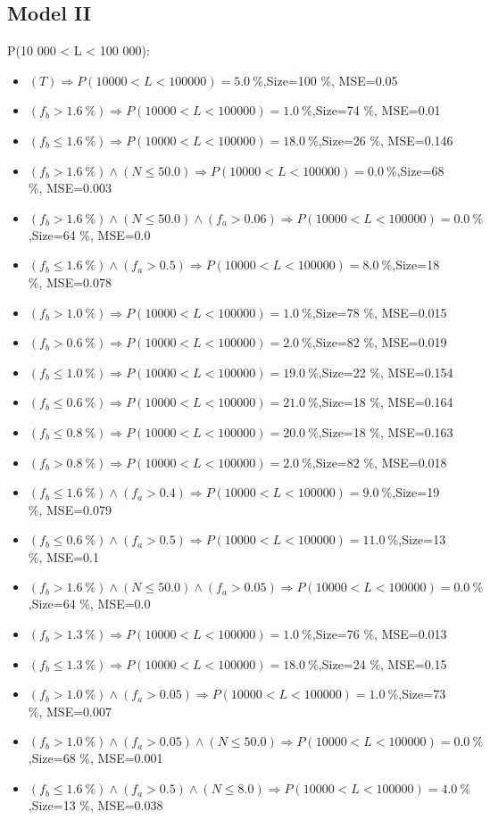 \documentclass[numbered]{CSL}
\begin{document}
\subsection{Model II}
P(10 000 < L < 100 000):
\begin{itemize}
\item $(T) \Rightarrow P(10 000 < L < 100 000) = 5.0~\%$,\hfill Size=100 \%, MSE=0.05
\item $(f_b > 1.6~\%) \Rightarrow P(10 000 < L < 100 000) = 1.0~\%$,\hfill Size=74 \%, MSE=0.01
\item $(f_b \leq 1.6~\%) \Rightarrow P(10 000 < L < 100 000) = 18.0~\%$,\hfill Size=26 \%, MSE=0.146
\item $(f_b > 1.6~\%) \land (N \leq 50.0) \Rightarrow P(10 000 < L < 100 000) = 0.0~\%$,\hfill Size=68 \%, MSE=0.003
\item $(f_b > 1.6~\%) \land (N \leq 50.0) \land (f_a > 0.06) \Rightarrow P(10 000 < L < 100 000) = 0.0~\%$,\hfill Size=64 \%, MSE=0.0
\item $(f_b \leq 1.6~\%) \land (f_a > 0.5) \Rightarrow P(10 000 < L < 100 000) = 8.0~\%$,\hfill Size=18 \%, MSE=0.078
\item $(f_b > 1.0~\%) \Rightarrow P(10 000 < L < 100 000) = 1.0~\%$,\hfill Size=78 \%, MSE=0.015
\item $(f_b > 0.6~\%) \Rightarrow P(10 000 < L < 100 000) = 2.0~\%$,\hfill Size=82 \%, MSE=0.019
\item $(f_b \leq 1.0~\%) \Rightarrow P(10 000 < L < 100 000) = 19.0~\%$,\hfill Size=22 \%, MSE=0.154
\item $(f_b \leq 0.6~\%) \Rightarrow P(10 000 < L < 100 000) = 21.0~\%$,\hfill Size=18 \%, MSE=0.164
\item $(f_b \leq 0.8~\%) \Rightarrow P(10 000 < L < 100 000) = 20.0~\%$,\hfill Size=18 \%, MSE=0.163
\item $(f_b > 0.8~\%) \Rightarrow P(10 000 < L < 100 000) = 2.0~\%$,\hfill Size=82 \%, MSE=0.018
\item $(f_b \leq 1.6~\%) \land (f_a > 0.4) \Rightarrow P(10 000 < L < 100 000) = 9.0~\%$,\hfill Size=19 \%, MSE=0.079
\item $(f_b \leq 0.6~\%) \land (f_a > 0.5) \Rightarrow P(10 000 < L < 100 000) = 11.0~\%$,\hfill Size=13 \%, MSE=0.1
\item $(f_b > 1.6~\%) \land (N \leq 50.0) \land (f_a > 0.05) \Rightarrow P(10 000 < L < 100 000) = 0.0~\%$,\hfill Size=64 \%, MSE=0.0
\item $(f_b > 1.3~\%) \Rightarrow P(10 000 < L < 100 000) = 1.0~\%$,\hfill Size=76 \%, MSE=0.013
\item $(f_b \leq 1.3~\%) \Rightarrow P(10 000 < L < 100 000) = 18.0~\%$,\hfill Size=24 \%, MSE=0.15
\item $(f_b > 1.0~\%) \land (f_a > 0.05) \Rightarrow P(10 000 < L < 100 000) = 1.0~\%$,\hfill Size=73 \%, MSE=0.007
\item $(f_b > 1.0~\%) \land (f_a > 0.05) \land (N \leq 50.0) \Rightarrow P(10 000 < L < 100 000) = 0.0~\%$,\hfill Size=68 \%, MSE=0.001
\item $(f_b \leq 1.6~\%) \land (f_a > 0.5) \land (N \leq 8.0) \Rightarrow P(10 000 < L < 100 000) = 4.0~\%$,\hfill Size=13 \%, MSE=0.038
\end{itemize}
\end{document}
